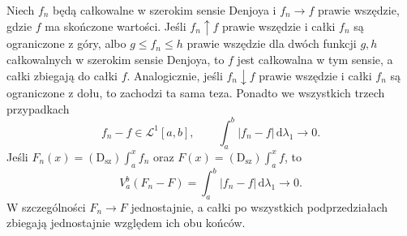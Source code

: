 \begin{wniosek}\label{ma1:kh:cor:wide-denjoy-limits}
Niech $f_n$ będą całkowalne w szerokim sensie Denjoya i $f_n\to f$ prawie wszędzie, gdzie $f$ ma skończone wartości. Jeśli $f_n\uparrow f$ prawie wszędzie i całki $f_n$ są ograniczone z góry, albo $g\le f_n\le h$ prawie wszędzie dla dwóch funkcji $g,h$ całkowalnych w szerokim sensie Denjoya, to $f$ jest całkowalna w tym sensie, a całki zbiegają do całki $f$. Analogicznie, jeśli $f_n\downarrow f$ prawie wszędzie i całki $f_n$ są ograniczone z dołu, to zachodzi ta sama teza. Ponadto we wszystkich trzech przypadkach
\[
 f_n-f\in\mathcal L^1[a,b],\qquad
 \int_a^b|f_n-f|\,\mathrm d\lambda_1\longrightarrow0.
\]
Jeśli $F_n(x)=(\mathrm D_{\mathrm{sz}})\int_a^x f_n$
oraz $F(x)=(\mathrm D_{\mathrm{sz}})\int_a^x f$, to
\[
 V_a^b(F_n-F)=\int_a^b|f_n-f|\,\mathrm d\lambda_1
 \longrightarrow0.
\]
W szczególności $F_n\to F$ jednostajnie, a całki po
wszystkich podprzedziałach zbiegają jednostajnie względem
ich obu końców.
\end{wniosek}

